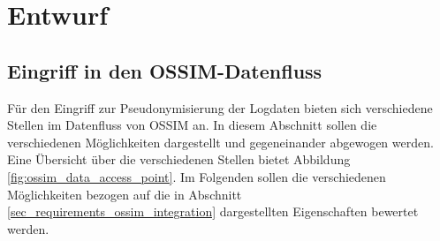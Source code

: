 \section{Entwurf}

\label{sec_impl_architecture}


\subsection*{Eingriff in den OSSIM-Datenfluss}


Für den Eingriff zur Pseudonymisierung der Logdaten bieten sich verschiedene Stellen im Datenfluss von OSSIM an. In diesem Abschnitt sollen die verschiedenen Möglichkeiten dargestellt und gegeneinander abgewogen werden. Eine Übersicht über die verschiedenen Stellen bietet Abbildung \ref{fig:ossim_data_access_point}. Im Folgenden sollen die verschiedenen Möglichkeiten bezogen auf die in Abschnitt \ref{sec_requirements_ossim_integration} dargestellten Eigenschaften bewertet werden.

